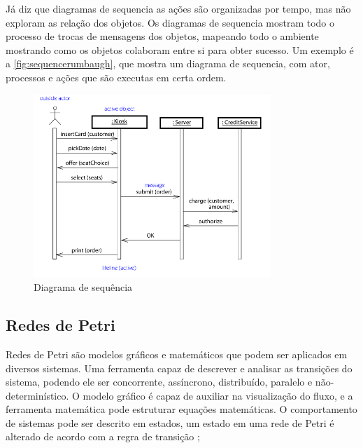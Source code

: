 Já  diz que diagramas de sequencia as ações são organizadas por tempo, mas não exploram as relação dos objetos. Os diagramas de sequencia mostram todo o processo de trocas de mensagens dos objetos, mapeando todo o ambiente mostrando como os objetos colaboram entre si para obter sucesso. Um exemplo é a \autoref{fig:sequencerumbaugh}, que mostra um diagrama de sequencia, com ator, processos e ações que são executas em certa ordem. 
 \begin{figure}[H]
	\centering
    	\caption{\label{fig:sequencerumbaugh} Diagrama de sequência }
		\includegraphics[width = 0.8\textwidth]	{resources/sequencediagramrumbaugh}
\end{figure}






\subsection{Redes de Petri}

Redes de Petri são modelos gráficos e matemáticos que podem ser aplicados em diversos sistemas. Uma ferramenta capaz de descrever e analisar as transições do sistema, podendo ele ser concorrente, assíncrono, distribuído, paralelo e não-determinístico. O modelo gráfico é capaz de auxiliar na visualização do fluxo, e a ferramenta matemática pode estruturar equações matemáticas. O comportamento de sistemas pode ser descrito em estados, um estado em uma rede de Petri é alterado de acordo com a regra de transição \cite{murata:1989};

